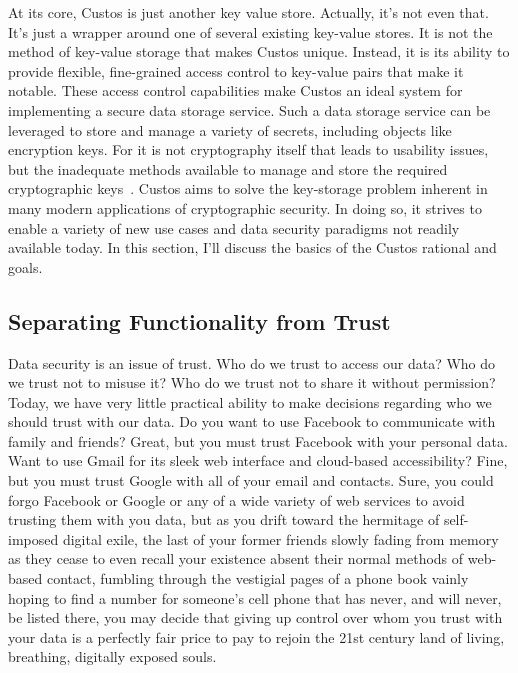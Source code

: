 At its core, Custos is just another key value store. Actually, it's
not even that. It's just a wrapper around one of several existing
key-value stores. It is not the method of key-value storage that makes
Custos unique. Instead, it is its ability to provide flexible,
fine-grained access control to key-value pairs that make it
notable. These access control capabilities make Custos an ideal system
for implementing a secure data storage service. Such a data storage
service can be leveraged to store and manage a variety of secrets,
including objects like encryption keys. For it is not cryptography
itself that leads to usability issues, but the inadequate methods
available to manage and store the required cryptographic
keys~\cite{Kher2005}. Custos aims to solve the key-storage problem
inherent in many modern applications of cryptographic security. In
doing so, it strives to enable a variety of new use cases and data
security paradigms not readily available today. In this section, I'll
discuss the basics of the Custos rational and goals.

\subsection{Separating Functionality from Trust}

Data security is an issue of trust. Who do we trust to access our
data? Who do we trust not to misuse it? Who do we trust not to share
it without permission? Today, we have very little practical ability to
make decisions regarding who we should trust with our data. Do you
want to use Facebook to communicate with family and friends? Great,
but you must trust Facebook with your personal data. Want to use Gmail
for its sleek web interface and cloud-based accessibility? Fine, but
you must trust Google with all of your email and contacts. Sure, you
could forgo Facebook or Google or any of a wide variety of web
services to avoid trusting them with you data, but as you drift toward
the hermitage of self-imposed digital exile, the last of your former
friends slowly fading from memory as they cease to even recall your
existence absent their normal methods of web-based contact, fumbling
through the vestigial pages of a phone book vainly hoping to find a
number for someone's cell phone that has never, and will never, be
listed there, you may decide that giving up control over whom you
trust with your data is a perfectly fair price to pay to rejoin the
21st century land of living, breathing, digitally exposed souls.

